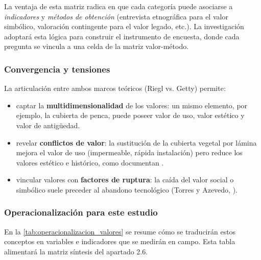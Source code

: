 La ventaja de esta matriz radica en que cada categoría puede
asociarse a \emph{indicadores} y \emph{métodos de obtención} (entrevista
etnográfica para el valor simbólico, valoración contingente para el
valor legado, etc.).
La investigación adoptará esta lógica para construir el instrumento de
encuesta, donde cada pregunta se vincula a una
celda de la matriz valor-método.

\subsubsection{Convergencia y tensiones}

La articulación entre ambos marcos teóricos (Riegl vs. Getty) permite:

\begin{itemize}
	\item captar la \textbf{multidimensionalidad} de los valores:
	      un mismo elemento, por ejemplo, la cubierta de penca, puede
	      poseer valor de uso, valor estético y valor de antigüedad.
	\item revelar \textbf{conflictos de valor}: la sustitución de la
	      cubierta vegetal por lámina mejora el valor de uso (impermeable,
	      rápida instalación) pero reduce los valores estético e
	      histórico, como documentan
	      \cite{juarez2018transformacion,alvarez2003maguey}.
	\item vincular valores con \textbf{factores de ruptura}: la caída del
	      valor social o simbólico suele preceder al abandono
	      tecnológico (Torres y Azevedo, \citeyear{torres2021transmision}).
\end{itemize}

\subsubsection{Operacionalización para este estudio}

En la \autoref{tab:operacionalizacion_valores} se resume cómo se
traducirán estos conceptos en variables e indicadores que se medirán en
campo.  Esta tabla alimentará la matriz síntesis del apartado 2.6.

